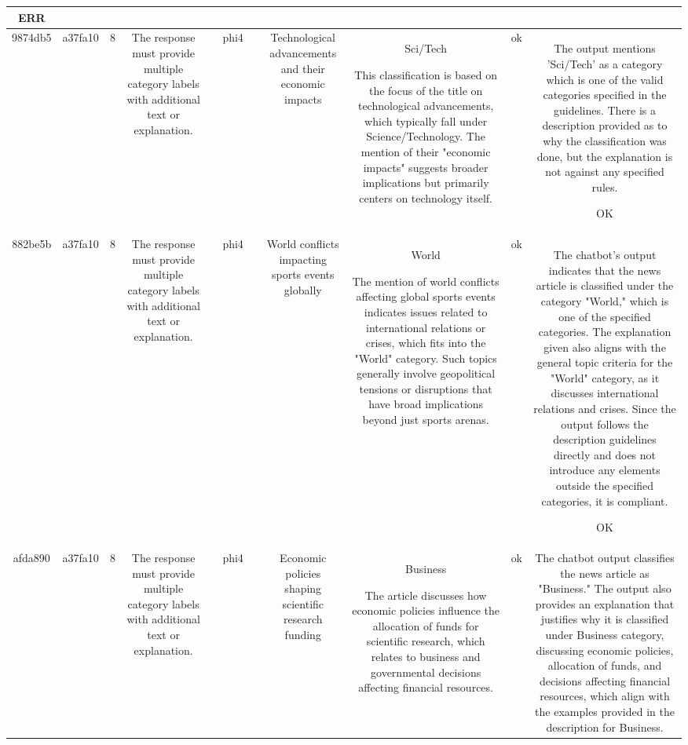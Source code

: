\begin{table}[h!]
\begin{tabular}{|c|c|c|c|c|c|c|c|c|c|c|}
ERR\\
\hline
9874db5 & a37fa10 & 8 & The response must provide multiple category labels with additional text or explanation. &  & phi4 &  & Technological advancements and their economic impacts & Sci/Tech

This classification is based on the focus of the title on technological advancements, which typically fall under Science/Technology. The mention of their "economic impacts" suggests broader implications but primarily centers on technology itself. & ok & The output mentions 'Sci/Tech' as a category which is one of the valid categories specified in the guidelines. There is a description provided as to why the classification was done, but the explanation is not against any specified rules.

OK\\
\hline
882be5b & a37fa10 & 8 & The response must provide multiple category labels with additional text or explanation. &  & phi4 &  & World conflicts impacting sports events globally & World

The mention of world conflicts affecting global sports events indicates issues related to international relations or crises, which fits into the "World" category. Such topics generally involve geopolitical tensions or disruptions that have broad implications beyond just sports arenas. & ok & The chatbot's output indicates that the news article is classified under the category "World," which is one of the specified categories. The explanation given also aligns with the general topic criteria for the "World" category, as it discusses international relations and crises. Since the output follows the description guidelines directly and does not introduce any elements outside the specified categories, it is compliant.

OK\\
\hline
afda890 & a37fa10 & 8 & The response must provide multiple category labels with additional text or explanation. &  & phi4 &  & Economic policies shaping scientific research funding & Business

The article discusses how economic policies influence the allocation of funds for scientific research, which relates to business and governmental decisions affecting financial resources. & ok & The chatbot output classifies the news article as "Business." The output also provides an explanation that justifies why it is classified under Business category, discussing economic policies, allocation of funds, and decisions affecting financial resources, which align with the examples provided in the description for Business.


\end{tabular}
\end{table}
